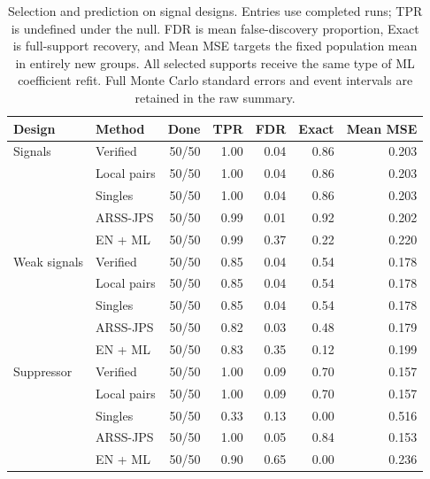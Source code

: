 \begin{table}[H]\centering\small
\setlength{\tabcolsep}{4pt}
\begin{tabular}{llrrrrr}
\toprule
Design & Method & Done & TPR & FDR & Exact & Mean MSE \\
\midrule
Signals & Verified & 50/50 & 1.00 & 0.04 & 0.86 & 0.203 \\
 & Local pairs & 50/50 & 1.00 & 0.04 & 0.86 & 0.203 \\
 & Singles & 50/50 & 1.00 & 0.04 & 0.86 & 0.203 \\
 & ARSS-JPS & 50/50 & 0.99 & 0.01 & 0.92 & 0.202 \\
 & EN + ML & 50/50 & 0.99 & 0.37 & 0.22 & 0.220 \\
\midrule
Weak signals & Verified & 50/50 & 0.85 & 0.04 & 0.54 & 0.178 \\
 & Local pairs & 50/50 & 0.85 & 0.04 & 0.54 & 0.178 \\
 & Singles & 50/50 & 0.85 & 0.04 & 0.54 & 0.178 \\
 & ARSS-JPS & 50/50 & 0.82 & 0.03 & 0.48 & 0.179 \\
 & EN + ML & 50/50 & 0.83 & 0.35 & 0.12 & 0.199 \\
\midrule
Suppressor & Verified & 50/50 & 1.00 & 0.09 & 0.70 & 0.157 \\
 & Local pairs & 50/50 & 1.00 & 0.09 & 0.70 & 0.157 \\
 & Singles & 50/50 & 0.33 & 0.13 & 0.00 & 0.516 \\
 & ARSS-JPS & 50/50 & 1.00 & 0.05 & 0.84 & 0.153 \\
 & EN + ML & 50/50 & 0.90 & 0.65 & 0.00 & 0.236 \\
\bottomrule
\end{tabular}
\caption{Selection and prediction on signal designs. Entries use completed runs; TPR is undefined under the null. FDR is mean false-discovery proportion, Exact is full-support recovery, and Mean MSE targets the fixed population mean in entirely new groups. All selected supports receive the same type of ML coefficient refit. Full Monte Carlo standard errors and event intervals are retained in the raw summary.}\label{tab:comparison_signal}
\end{table}

